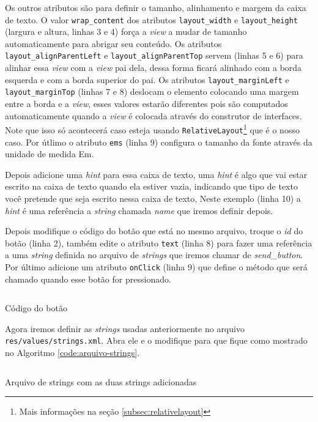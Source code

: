 \documentclass[a4paper,12pt,brazil]{book}
\begin{document}
\begin{singlespace}
Os outros atributos são para definir o tamanho, alinhamento e margem da caixa de texto. O valor \texttt{wrap\_content} dos atributos \texttt{layout\_width} e \texttt{layout\_height} (largura e altura, linhas 3 e 4) força a \emph{view} a mudar de tamanho automaticamente para abrigar seu conteúdo. Os atributos \texttt{layout\_alignParentLeft} e \texttt{layout\_alignParentTop} servem (linhas 5 e 6) para alinhar essa \emph{view} com a \emph{view} pai dela, dessa forma ficará alinhado com a borda esquerda e com a borda superior do pai. Os atributos \texttt{layout\_marginLeft} e \texttt{layout\_marginTop} (linhas 7 e 8) deslocam o elemento colocando uma margem entre a borda e a \emph{view}, esses valores estarão diferentes pois são computados automaticamente quando a \emph{view} é colocada através do construtor de interfaces. Note que isso só acontecerá caso esteja usando \texttt{RelativeLayout}\footnote{Mais informações na seção \ref{subsec:relativelayout}} que é o nosso caso. Por útlimo o atributo \texttt{ems} (linha 9) configura o tamanho da fonte através da unidade de medida Em.

Depois adicione uma \textit{hint} para essa caixa de texto, uma \textit{hint} é algo que vai estar escrito na caixa de texto quando ela estiver vazia, indicando que tipo de texto você pretende que seja escrito nessa caixa de texto, Neste exemplo (linha 10) a \textit{hint} é uma referência a \emph{string} chamada \emph{name} que iremos definir depois.

Depois modifique o código do botão que está no mesmo arquivo, troque o \emph{id} do botão (linha 2), também edite o atributo \texttt{text} (linha 8) para fazer uma referência a uma \emph{string} definida no arquivo de \emph{strings} que iremos chamar de \emph{send\_button}. Por último adicione um atributo \texttt{onClick} (linha 9) que define o método que será chamado quando esse botão for pressionado.

\begin{listing}[H]
\inputminted[linenos=true,fontsize=\small,frame=lines, framesep=2mm, tabsize=2,numbersep=5pt]{xml}{src/firstapp/2.xml}
\caption{Código do botão}
\end{listing}

Agora iremos definir as \emph{strings} usadas anteriormente no arquivo \texttt{res/values/strings.xml}. Abra ele e o modifique para que fique como mostrado no Algoritmo \ref{code:arquivo-strings}.

\begin{listing}
\inputminted[linenos=true,fontsize=\small,frame=lines, framesep=2mm, tabsize=2,numbersep=5pt]{xml}{src/firstapp/3.xml}
\caption{Arquivo de strings com as duas strings adicionadas}
\label{code:arquivo-strings}
\end{listing}


\end{singlespace}
\end{document}
